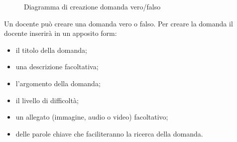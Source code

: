 \documentclass[a4paper, titlepage]{article}
\begin{document}
\newpage
{}
\begin{figure}[H]
	\centering
	\noindent{}
	\caption{Diagramma di creazione domanda vero/falso}
\end{figure}
Un docente può creare una domanda vero o falso. Per creare la domanda il docente inserirà in un apposito form:
\begin{itemize}
	\item il titolo della domanda;
	\item una descrizione facoltativa;
	\item l'argomento della domanda; 
	\item il livello di difficoltà;
	\item un allegato (immagine, audio o video) facoltativo;
	\item delle parole chiave che faciliteranno la ricerca della domanda.
\end{itemize}
\end{document}
